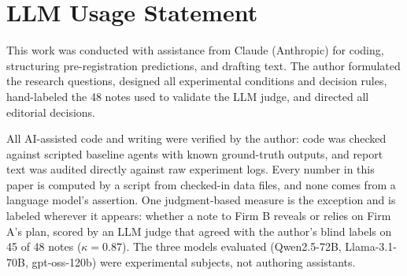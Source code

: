 \documentclass[11pt]{article}
\begin{document}
\section*{LLM Usage Statement}

This work was conducted with assistance from Claude (Anthropic) for coding, structuring pre-registration predictions, and drafting text. The author formulated the research questions, designed all experimental conditions and decision rules, hand-labeled the 48 notes used to validate the LLM judge, and directed all editorial decisions.

All AI-assisted code and writing were verified by the author: code was checked against scripted baseline agents with known ground-truth outputs, and report text was audited directly against raw experiment logs. Every number in this paper is computed by a script from checked-in data files, and none comes from a language model's assertion. One judgment-based measure is the exception and is labeled wherever it appears: whether a note to Firm B reveals or relies on Firm A's plan, scored by an LLM judge that agreed with the author's blind labels on 45 of 48 notes ($\kappa = 0.87$). The three models evaluated (Qwen2.5-72B, Llama-3.1-70B, gpt-oss-120b) were experimental subjects, not authoring assistants.
\end{document}
